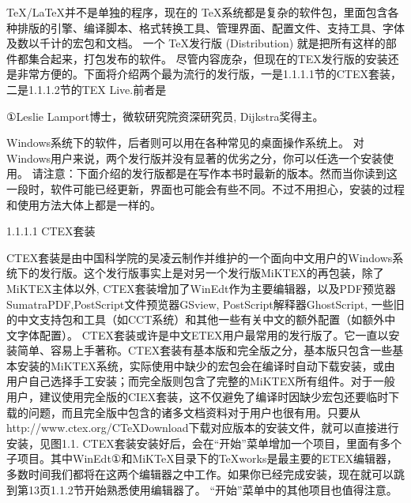 \documentclass[UTF8]{ctexart}
\begin{document}
\TeX/\LaTeX 并不是单独的程序，现在的 \TeX 系统都是复杂的软件包，里面包含各种排版的引擎、编译脚本、格式转换工具、管理界面、配置文件、支持工具、字体及数以千计的宏包和文档。
一个 \TeX 发行版 (Distribution) 就是把所有这样的部件都集合起来，打包发布的软件。
尽管内容庞杂，但现在的TEX发行版的安装还是非常方便的。下面将介绍两个最为流行的发行版，一是1.1.1.1节的CTEX套装，二是1.1.1.2节的TEX Live.前者是

①Leslie Lamport博士，微软研究院资深研究员, Dijkstra奖得主。

Windows系统下的软件，后者则可以用在各种常见的桌面操作系统上。
对Windows用户来说，两个发行版并没有显著的优劣之分，你可以任选一个安装使用。
请注意：下面介绍的发行版都是在写作本书时最新的版本。然而当你读到这一段时，软件可能已经更新，界面也可能会有些不同。不过不用担心，安装的过程和使用方法大体上都是一样的。

1.1.1.1 CTEX套装

CTEX套装是由中国科学院的吴凌云制作并维护的一个面向中文用户的Windows系统下的发行版。这个发行版事实上是对另一个发行版MiKTEX的再包装，除了MiKTEX主体以外, CTEX套装增加了WinEdt作为主要编辑器，以及PDF预览器SumatraPDF,PostScript文件预览器GSview, PostScript解释器GhostScript, 一些旧的中文支持包和工具（如CCT系统）和其他一些有关中文的额外配置（如额外中文字体配置）。
CTEX套装或许是中文ETEX用户最常用的发行版了。它一直以安装简单、容易上手著称。CTEX套装有基本版和完全版之分，基本版只包含一些基本安装的MiKTEX系统，实际使用中缺少的宏包会在编译时自动下载安装，或由用户自己选择手工安装；而完全版则包含了完整的MiKTEX所有组件。对于一般用户，建议使用完全版的CIEX套装，这不仅避免了编译时因缺少宏包还要临时下载的问题，而且完全版中包含的诸多文档资料对于用户也很有用。只要从http://www.ctex.org/CTeXDownload下载对应版本的安装文件，就可以直接进行安装，见图1.1.
CTEX套装安装好后，会在“开始”菜单增加一个项目，里面有多个子项目。其中WinEdt①和MiKTeX目录下的TeXworks是最主要的ETEX编辑器，多数时间我们都将在这两个编辑器之中工作。如果你已经完成安装，现在就可以跳到第13页1.1.2节开始熟悉使用编辑器了。
“开始”菜单中的其他项目也值得注意。
\end{document}
